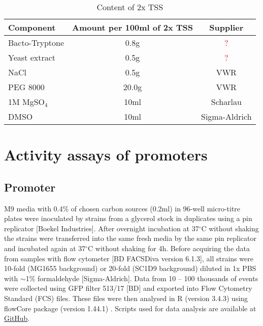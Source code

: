 \begin{center}
	\begin{longtable}[c]{|l|c|c|}
\caption{Content of 2x TSS} \label{tss} \\

\toprule \multicolumn{1}{|l|}{\textbf{Component}} & \multicolumn{1}{c|}{\textbf{Amount per 100ml of 2x TSS}} & \multicolumn{1}{c|}{\textbf{Supplier}} \\
\midrule
\endhead

\bottomrule
\endlastfoot

Bacto-Tryptone & 0.8g & \textcolor{red}{?} \\
\hline
Yeast extract & 0.5g & \textcolor{red}{?} \\
\hline
NaCl & 0.5g & VWR \\
\hline
PEG 8000 & 20.0g & VWR \\
\hline
1M MgSO$_{4}$ & 10ml & Scharlau \\
\hline
DMSO & 10ml & Sigma-Aldrich \\
	\end{longtable}
\end{center}


\section{Activity assays of promoters}
\subsection{Promoter }
M9 media with 0.4\% of chosen carbon sources (0.2ml) in 96-well micro-titre plates were inoculated by strains from a glycerol stock in duplicates using a pin replicator [Boekel Industries].
After overnight incubation at 37$^{\circ}$C without shaking the strains were transferred into the same fresh media by the same pin replicator and incubated again at 37$^{\circ}$C without shaking for 4h.
Before acquiring the data from samples with flow cytometer [BD FACSDiva version 6.1.3], all strains were 10-fold (MG1655 background) or 20-fold (SC1\textunderscore D9 background) diluted in 1x PBS with $\sim$1\% formaldehyde [Sigma-Aldrich].
Data from 10 -- 100 thousands of events were collected using GFP filter 513/17 [BD] and exported into Flow Cytometry Standard (FCS) files.
These files were then analysed in R (version 3.4.3) using flowCore package (version 1.44.1) \cite{hahne2009flowcore}.
Scripts used for data analysis are available at \href{https://github.com/marketavlkova/LacZ_FC}{GitHub}.

